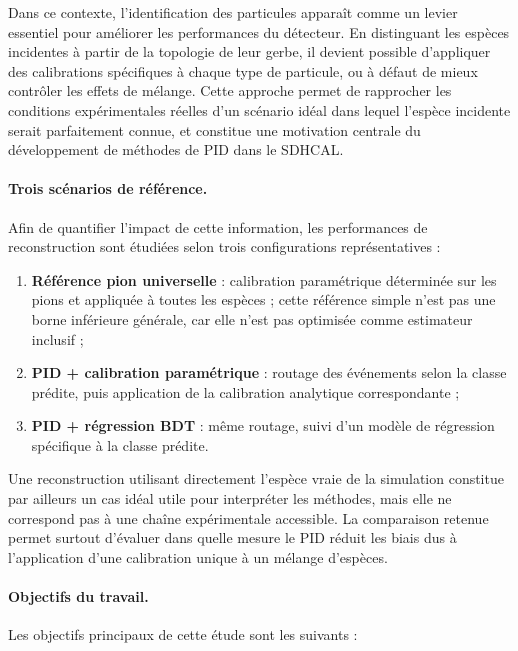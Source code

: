 Dans ce contexte, l’identification des particules apparaît comme un levier essentiel pour améliorer les performances du détecteur. En distinguant les espèces incidentes à partir de la topologie de leur gerbe, il devient possible d’appliquer des calibrations spécifiques à chaque type de particule, ou à défaut de mieux contrôler les effets de mélange. Cette approche permet de rapprocher les conditions expérimentales réelles d’un scénario idéal dans lequel l’espèce incidente serait parfaitement connue, et constitue une motivation centrale du développement de méthodes de PID dans le SDHCAL.

\paragraph{Trois scénarios de référence.}

Afin de quantifier l’impact de cette information, les performances de reconstruction sont étudiées selon trois configurations représentatives :

\begin{enumerate}[label=(\roman*)]
    \item \textbf{Référence pion universelle} : calibration paramétrique déterminée sur les pions et appliquée à toutes les espèces ; cette référence simple n’est pas une borne inférieure générale, car elle n’est pas optimisée comme estimateur inclusif ;
    \item \textbf{PID + calibration paramétrique} : routage des événements selon la classe prédite, puis application de la calibration analytique correspondante ;
    \item \textbf{PID + régression BDT} : même routage, suivi d’un modèle de régression spécifique à la classe prédite.
\end{enumerate}

Une reconstruction utilisant directement l’espèce vraie de la simulation constitue par ailleurs un cas idéal utile pour interpréter les méthodes, mais elle ne correspond pas à une chaîne expérimentale accessible. La comparaison retenue permet surtout d’évaluer dans quelle mesure le PID réduit les biais dus à l’application d’une calibration unique à un mélange d’espèces.

\paragraph{Objectifs du travail.}

Les objectifs principaux de cette étude sont les suivants :

